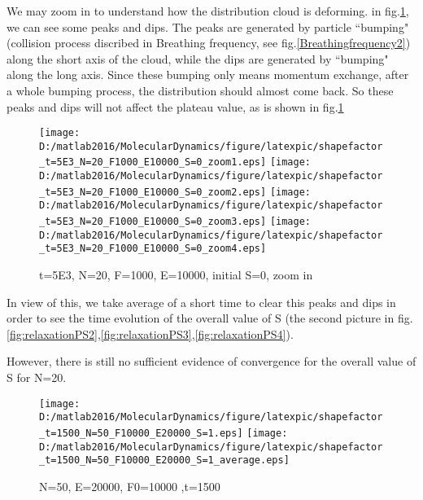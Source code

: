 \documentclass[aps,pre,twocolumn
,groupedaddress]{revtex4-1}
\begin{document}
We may zoom in to understand how the distribution cloud is deforming. 
in fig.\ref{fig:relaxationPS5}, we can see some peaks and dips. The peaks are generated by particle ``bumping" (collision process discribed in Breathing frequency, see fig.\ref{Breathingfrequency2}) along the short axis of the cloud, while the dips are generated by ``bumping" along the long axis. Since these bumping only means momentum exchange, after a whole bumping process, the distribution should almost come back. So these peaks and dips will not affect the plateau value, as is shown in fig.\ref{fig:relaxationPS5}
\begin{figure}[hbtp]
\centering
\texttt{[image: D:/matlab2016/MolecularDynamics/figure/latexpic/shapefactor\_t=5E3\_N=20\_F1000\_E10000\_S=0\_zoom1.eps]}
\texttt{[image: D:/matlab2016/MolecularDynamics/figure/latexpic/shapefactor\_t=5E3\_N=20\_F1000\_E10000\_S=0\_zoom2.eps]} 
\texttt{[image: D:/matlab2016/MolecularDynamics/figure/latexpic/shapefactor\_t=5E3\_N=20\_F1000\_E10000\_S=0\_zoom3.eps]} 
\texttt{[image: D:/matlab2016/MolecularDynamics/figure/latexpic/shapefactor\_t=5E3\_N=20\_F1000\_E10000\_S=0\_zoom4.eps]} 
\caption{t=5E3, N=20, F=1000, E=10000, initial S=0, zoom in}
\label{fig:relaxationPS5}
\end{figure}

In view of this, we take average of a short time to clear this peaks and dips in order to see the time evolution of the overall value of S (the second picture in fig.\ref{fig:relaxationPS2},\ref{fig:relaxationPS3},\ref{fig:relaxationPS4}).

However, there is still no sufficient evidence of convergence for the overall value of S for N=20. 
\begin{figure}[hbtp]

\centering
\texttt{[image: D:/matlab2016/MolecularDynamics/figure/latexpic/shapefactor\_t=1500\_N=50\_F10000\_E20000\_S=1.eps]}
\texttt{[image: D:/matlab2016/MolecularDynamics/figure/latexpic/shapefactor\_t=1500\_N=50\_F10000\_E20000\_S=1\_average.eps]} 
\caption{N=50, E=20000, F0=10000 ,t=1500}
\label{fig:relaxationPS6}
\end{figure}

\newpage
\end{document}
